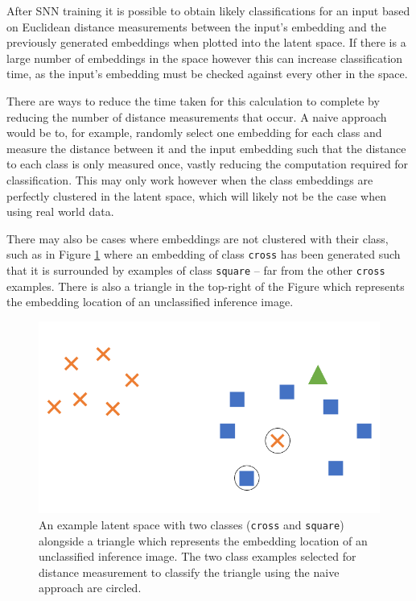 After SNN training it is possible to obtain likely classifications for an input based on Euclidean distance measurements between the input's embedding and the previously generated embeddings when plotted into the latent space. If there is a large number of embeddings in the space however this can increase classification time, as the input's embedding must be checked against every other in the space. 

There are ways to reduce the time taken for this calculation to complete by reducing the number of distance measurements that occur. A naive approach would be to, for example, randomly select one embedding for each class and measure the distance between it and the input embedding such that the distance to each class is only measured once, vastly reducing the computation required for classification. This may only work however when the class embeddings are perfectly clustered in the latent space, which will likely not be the case when using real world data.

There may also be cases where embeddings are not clustered with their class, such as in Figure \ref{fig:naive-embedding-example} where an embedding of class \texttt{cross} has been generated such that it is surrounded by examples of class \texttt{square} -- far from the other \texttt{cross} examples. There is also a triangle in the top-right of the Figure which represents the embedding location of an unclassified inference image. 

 \begin{figure}[h]
	\begin{center}
		\includegraphics[scale=0.5]{Chapter6/figs/naive-embedding-example.png}
	\end{center}
	\caption{An example latent space with two classes (\texttt{cross} and \texttt{square}) alongside a triangle which represents the embedding location of an unclassified inference image. The two class examples selected for distance measurement to classify the triangle using the naive approach are circled.}
	\label{fig:naive-embedding-example}
\end{figure}

